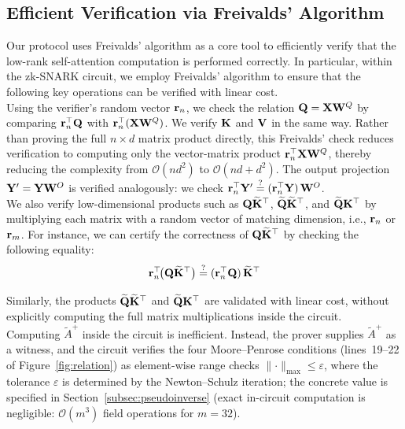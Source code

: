 \documentclass[runningheads]{llncs}
\begin{document}
\subsection{Efficient Verification via Freivalds' Algorithm}
\label{moore-penrose}
Our protocol uses Freivalds' algorithm as a core tool to efficiently verify that the low-rank self-attention computation is performed correctly. In particular, within the zk-SNARK circuit, we employ Freivalds' algorithm to ensure that the following key operations can be verified with linear cost. \\

Using the verifier's random vector ${\mathbf{r}}_n$, we check the relation ${\mathbf{Q}} = {\mathbf{X}} {\mathbf{W}}^Q$ by comparing ${\mathbf{r}}_n^{\top} {\mathbf{Q}}$ with ${\mathbf{r}}_n^{\top}({\mathbf{X}} {\mathbf{W}}^Q)$.
We verify ${\mathbf{K}}$ and ${\mathbf{V}}$ in the same way. Rather than proving the full $n\times d$ matrix product directly, this Freivalds' check reduces verification to computing only the vector-matrix product ${\mathbf{r}}_n^{\top}{\mathbf{X}} {\mathbf{W}}^Q$, thereby reducing the complexity from $\mathcal{O}(n d^2)$ to $\mathcal{O}(nd + d^2)$. The output projection ${\mathbf{Y}}'={\mathbf{Y}} {\mathbf{W}}^O$ is verified analogously: we check ${\mathbf{r}}_n^{\top}{\mathbf{Y}}' \stackrel{?}{=} ({\mathbf{r}}_n^{\top}{\mathbf{Y}})\,{\mathbf{W}}^O$. \\

We also verify low-dimensional products such as ${\mathbf{Q}}\widetilde{{\mathbf{K}}}^{\top}$,
$\widetilde{{\mathbf{Q}}}\widetilde{{\mathbf{K}}}^{\top}$, and $\widetilde{{\mathbf{Q}}}{\mathbf{K}}^{\top}$
by multiplying each matrix with a random vector of matching dimension,
i.e., ${\mathbf{r}}_n$ or ${\mathbf{r}}_m$.
For instance, we can certify the correctness of ${\mathbf{Q}}\widetilde{{\mathbf{K}}}^{\top}$ by checking the following equality:
\[
{\mathbf{r}}_n^{\top}\!\bigl({\mathbf{Q}}\widetilde{{\mathbf{K}}}^{\top}\bigr)
\stackrel{?}{=}
({\mathbf{r}}_n^{\top}{\mathbf{Q}})\,\widetilde{{\mathbf{K}}}^{\top}
\]

Similarly, the products $\widetilde{{\mathbf{Q}}}\widetilde{{\mathbf{K}}}^{\top}$ and $\widetilde{{\mathbf{Q}}}{\mathbf{K}}^{\top}$ are validated with linear cost, without explicitly computing the full matrix multiplications inside the circuit. \\

Computing $\tilde{A}^{+}$ inside the circuit is inefficient. Instead, the prover supplies $\tilde{A}^{+}$ as a witness, and the circuit verifies the four Moore--Penrose conditions (lines~19--22 of Figure~\ref{fig:relation}) as element-wise range checks $\lVert\cdot\rVert_{\max}\leq\varepsilon$, where the tolerance $\varepsilon$ is determined by the Newton--Schulz iteration; the concrete value is specified in Section~\ref{subsec:pseudoinverse} (exact in-circuit computation is negligible: $\mathcal{O}(m^3)$ field operations for $m{=}32$).
\end{document}
